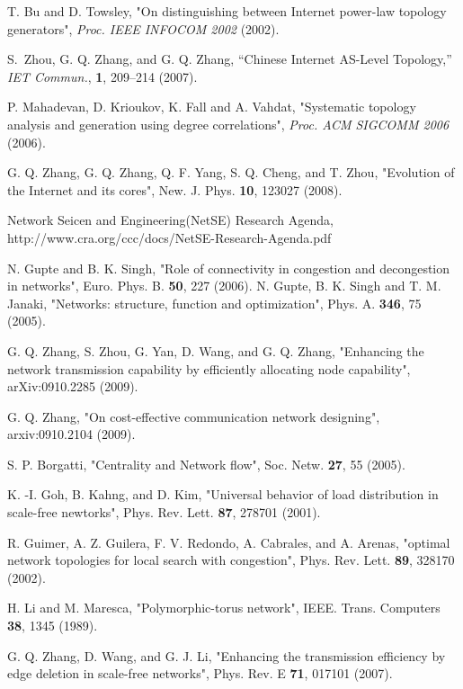 \documentclass[journal]{IEEEtran}
\begin{document}
{\begin{thebibliography}{5}
 T. Bu and D. Towsley, "On distinguishing between
Internet power-law topology generators", \emph{Proc. IEEE INFOCOM
2002} (2002).

S.~Zhou, G. Q. Zhang, and G. Q. Zhang, ``{Chinese Internet AS-Level
  Topology},'' \emph{IET Commun.}, {\bf 1}, 209--214 (2007).

 P. Mahadevan, D. Krioukov, K. Fall and A.
Vahdat, "Systematic topology analysis and generation using degree
correlations", \emph{Proc. ACM SIGCOMM 2006} (2006).

G. Q. Zhang, G. Q. Zhang, Q. F. Yang,
S. Q. Cheng, and T. Zhou, "Evolution of the Internet and its cores",
New. J. Phys. {\bf 10}, 123027 (2008).



Network Seicen and Engineering(NetSE) Research
Agenda, http://www.cra.org/ccc/docs/NetSE-Research-Agenda.pdf

 N. Gupte and B. K. Singh,  "Role of connectivity in congestion and decongestion in networks", Euro. Phys. B. {\bf 50}, 227 (2006).
N. Gupte, B. K. Singh and T. M. Janaki, "Networks: structure, function and optimization", Phys. A.
{\bf 346}, 75 (2005).

 G. Q. Zhang, S. Zhou, G.
Yan, D. Wang, and G. Q. Zhang, "Enhancing the network transmission
capability by efficiently allocating node capability",
arXiv:0910.2285 (2009).

 G. Q. Zhang, "On cost-effective
communication network designing", arxiv:0910.2104 (2009).

 S. P. Borgatti,  "Centrality and Network flow", Soc. Netw. {\bf 27}, 55
(2005).

 K. -I. Goh, B. Kahng, and D. Kim, "Universal behavior of load distribution in scale-free newtorks", Phys. Rev. Lett. {\bf
87}, 278701 (2001).

 R. Guimer, A. Z. Guilera, F. V. Redondo, A. Cabrales, and A. Arenas, "optimal network topologies for local search with congestion", Phys. Rev. Lett. {\bf 89}, 328170
(2002).

 H. Li and M. Maresca, "Polymorphic-torus network", IEEE. Trans. Computers {\bf 38}, 1345
(1989).

 G. Q. Zhang, D. Wang, and G. J. Li, "Enhancing the transmission efficiency by edge deletion in scale-free networks", Phys. Rev. E {\bf 71}, 017101
(2007).


\end{thebibliography}}
\end{document}
